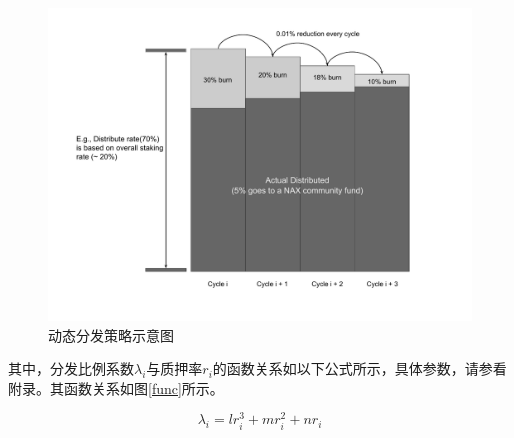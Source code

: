 \begin{figure}[htbp]
  \centering
    \includegraphics[width=1\textwidth]{../common/dynamic_dist.pdf}
    \caption{动态分发策略示意图 \label{fig:dynamic_dist}}
\end{figure}

其中，分发比例系数\(\lambda_i\)与质押率\(r_i\)的函数关系如以下公式所示，具体参数，请参看附录。其函数关系如图\ref{func}所示。

  \begin{equation}
    \lambda_i = l r_i^3 + m r_i^2 + n r_i
  \end{equation}

